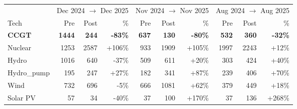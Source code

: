 \begin{tabular}{l r r r r r r r r r}
\toprule
 & \multicolumn{3}{c}{Dec 2024 $\to$ Dec 2025} & \multicolumn{3}{c}{Nov 2024 $\to$ Nov 2025} & \multicolumn{3}{c}{Aug 2024 $\to$ Aug 2025} \\
\cmidrule(lr){2-4}\cmidrule(lr){5-7}\cmidrule(lr){8-10}
Tech & Pre & Post & \% & Pre & Post & \% & Pre & Post & \% \\
\midrule
\textbf{CCGT} & \textbf{1444} & \textbf{244} & \textbf{-83\%} & \textbf{637} & \textbf{130} & \textbf{-80\%} & \textbf{532} & \textbf{360} & \textbf{-32\%} \\
Nuclear & 1253 & 2587 & +106\% & 933 & 1909 & +105\% & 1997 & 2243 & +12\% \\
Hydro & 1016 & 640 & -37\% & 509 & 611 & +20\% & 303 & 424 & +40\% \\
Hydro\_pump & 195 & 247 & +27\% & 182 & 341 & +87\% & 239 & 406 & +70\% \\
Wind & 732 & 696 & -5\% & 666 & 1081 & +62\% & 379 & 449 & +18\% \\
Solar PV & 57 & 34 & -40\% & 37 & 100 & +170\% & 37 & 136 & +268\% \\
\bottomrule
\end{tabular}